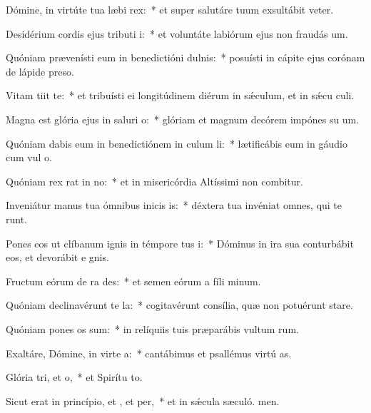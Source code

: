 \item Dómine, in virtúte tua læbi rex:~* et super salutáre tuum exsultábit veter.
\item Desidérium cordis ejus tributi i:~* et voluntáte labiórum ejus non fraudás um.
\item Quóniam prævenísti eum in benedictióni dulnis:~* posuísti in cápite ejus corónam de lápide preso.
\item Vitam tiit  te:~* et tribuísti ei longitúdinem diérum in sǽculum, et in sǽcu culi.
\item Magna est glória ejus in saluri o:~* glóriam et magnum decórem impónes su um.
\item Quóniam dabis eum in benedictiónem in culum li:~* lætificábis eum in gáudio cum vul o.
\item Quóniam rex rat in no:~* et in misericórdia Altíssimi non combitur.
\item Inveniátur manus tua ómnibus inicis is:~* déxtera tua invéniat omnes, qui te runt.
\item Pones eos ut clíbanum ignis in témpore tus i:~* Dóminus in ira sua conturbábit eos, et devorábit e gnis.
\item Fructum eórum de ra des:~* et semen eórum a fíli minum.
\item Quóniam declinavérunt  te la:~* cogitavérunt consília, quæ non potuérunt stare.
\item Quóniam pones os sum:~* in relíquiis tuis præparábis vultum rum.
\item Exaltáre, Dómine, in virte a:~* cantábimus et psallémus virtú as.
\item Glória tri, et o,~* et Spirítu to.
\item Sicut erat in princípio, et , et per,~* et in sǽcula sæculó. men.
